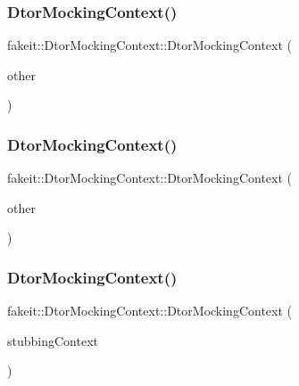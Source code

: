 \subsubsection{\texorpdfstring{DtorMockingContext()}{DtorMockingContext()}\hspace{0.1cm}{\footnotesize\ttfamily [20/27]}}
{\footnotesize\ttfamily fakeit\+::\+Dtor\+Mocking\+Context\+::\+Dtor\+Mocking\+Context (\begin{DoxyParamCaption}\item[{\mbox{\hyperlink{classfakeit_1_1DtorMockingContext}{Dtor\+Mocking\+Context}} \&}]{other }\end{DoxyParamCaption})\hspace{0.3cm}{\ttfamily [inline]}}

\mbox{\label{classfakeit_1_1DtorMockingContext_a0cf507524171b8ab2884f269a8a62a60}} 
\subsubsection{\texorpdfstring{DtorMockingContext()}{DtorMockingContext()}\hspace{0.1cm}{\footnotesize\ttfamily [21/27]}}
{\footnotesize\ttfamily fakeit\+::\+Dtor\+Mocking\+Context\+::\+Dtor\+Mocking\+Context (\begin{DoxyParamCaption}\item[{\mbox{\hyperlink{classfakeit_1_1DtorMockingContext}{Dtor\+Mocking\+Context}} \&\&}]{other }\end{DoxyParamCaption})\hspace{0.3cm}{\ttfamily [inline]}}

\mbox{\label{classfakeit_1_1DtorMockingContext_a81c785463a44f396c4c3e5e0e1c9e40d}} 
\subsubsection{\texorpdfstring{DtorMockingContext()}{DtorMockingContext()}\hspace{0.1cm}{\footnotesize\ttfamily [22/27]}}
{\footnotesize\ttfamily fakeit\+::\+Dtor\+Mocking\+Context\+::\+Dtor\+Mocking\+Context (\begin{DoxyParamCaption}\item[{\mbox{\hyperlink{classfakeit_1_1MethodMockingContext}{Method\+Mocking\+Context}}$<$ void $>$\+::Context $\ast$}]{stubbing\+Context }\end{DoxyParamCaption})\hspace{0.3cm}{\ttfamily [inline]}}

